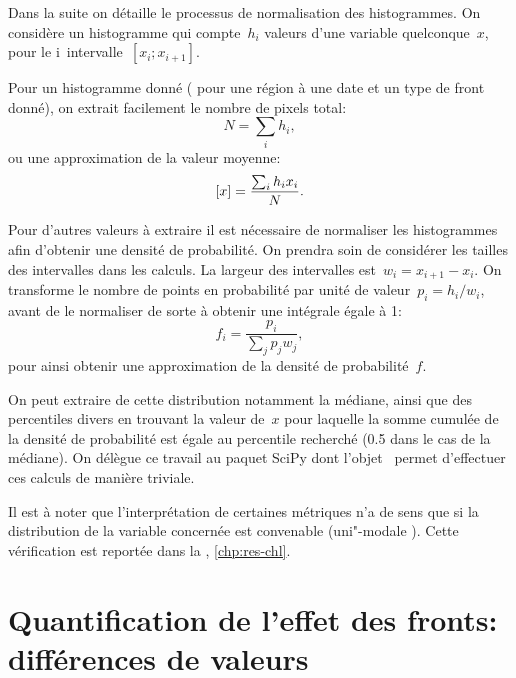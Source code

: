 Dans la suite on détaille le processus de normalisation des histogrammes.
On considère un histogramme qui compte~\(h_i\) valeurs d'une variable quelconque~\(x\), pour le i\ieme{}~intervalle~\(\left[x_i; x_{i+1} \right]\).

Pour un histogramme donné ( pour une région à une date et un type de front donné), on extrait facilement le nombre de pixels total:
\begin{equation}
  N = \sum_i h_i,
\end{equation}
ou une approximation de la valeur moyenne:
\begin{equation}
  \left[x\right] = \frac{\sum_i h_i x_i} {N}.
\end{equation}

Pour d'autres valeurs à extraire il est nécessaire de normaliser les histogrammes afin d'obtenir une densité de probabilité. On prendra soin de considérer les tailles des intervalles dans les calculs.
La largeur des intervalles est~\(w_i = x_{i+1}-x_i\). On transforme le nombre de points en probabilité par unité de valeur~\(p_i = h_i / w_i \), avant de le normaliser de sorte à obtenir une intégrale égale à 1:
\begin{equation}
  f_i = \frac{p_i} {\sum_j p_j w_j},
\end{equation}
pour ainsi obtenir une approximation de la densité de probabilité~\(f\).

On peut extraire de cette distribution notamment la médiane, ainsi que des percentiles divers en trouvant la valeur de~\(x\) pour laquelle la somme cumulée de la densité de probabilité est égale au percentile recherché (0.5 dans le cas de la médiane).
On délègue ce travail au paquet SciPy dont l'objet~ permet d'effectuer ces calculs de manière triviale.

Il est à noter que l'interprétation de certaines métriques n'a de sens que si la distribution de la variable concernée est convenable (uni"-modale ).
Cette vérification est reportée dans la , \cref*{chp:res-chl}.

\section{Quantification de l'effet des fronts: différences de valeurs}
\label{sec:extraction-surplus-lag}

